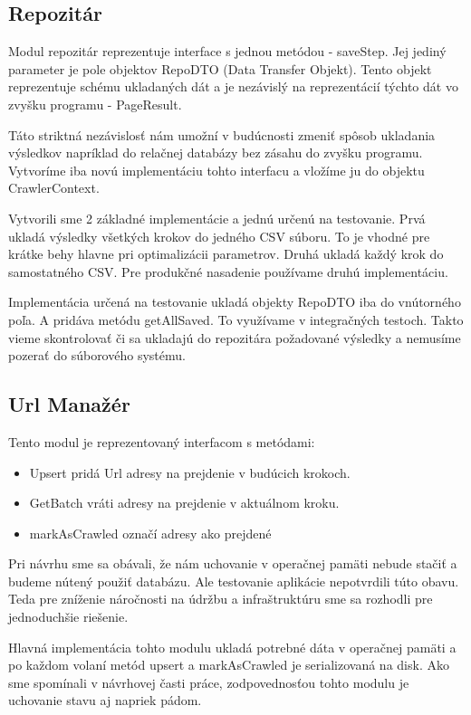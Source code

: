 \subsection{Repozitár}
Modul repozitár reprezentuje interface s jednou metódou - saveStep. Jej jediný parameter je pole objektov RepoDTO (Data Transfer Objekt). Tento objekt reprezentuje schému ukladaných dát a je nezávislý na reprezentácií týchto dát vo zvyšku programu - PageResult. 

Táto striktná nezávislosť nám umožní v budúcnosti zmeniť spôsob ukladania výsledkov napríklad do relačnej databázy bez zásahu do zvyšku programu. Vytvoríme iba novú implementáciu tohto interfacu a vložíme ju do objektu CrawlerContext. 

Vytvorili sme 2 základné implementácie a jednú určenú na testovanie. Prvá ukladá výsledky všetkých krokov do jedného CSV súboru. To je vhodné pre krátke behy hlavne pri optimalizácii parametrov. Druhá ukladá každý krok do samostatného CSV. Pre produkčné nasadenie používame druhú implementáciu. 

Implementácia určená na testovanie ukladá objekty RepoDTO iba do vnútorného poľa. A pridáva metódu getAllSaved. To využívame v integračných testoch. Takto vieme skontrolovať či sa ukladajú do repozitára požadované výsledky a nemusíme pozerať do súborového systému. 


\subsection{Url Manažér}
Tento modul je reprezentovaný interfacom s metódami:
\begin{itemize}
    \item Upsert pridá Url adresy na prejdenie v budúcich krokoch. 
    \item GetBatch vráti adresy na prejdenie v aktuálnom kroku. 
    \item markAsCrawled označí adresy ako prejdené
\end{itemize}


Pri návrhu sme sa obávali, že nám uchovanie v operačnej pamäti nebude stačiť a budeme nútený použiť databázu. Ale testovanie aplikácie nepotvrdili túto obavu. Teda pre zníženie náročnosti na údržbu a infraštruktúru sme sa rozhodli pre jednoduchšie riešenie.

Hlavná implementácia tohto modulu ukladá potrebné dáta v operačnej pamäti a po každom volaní metód upsert a markAsCrawled je serializovaná na disk. Ako sme spomínali v návrhovej časti práce, zodpovednosťou tohto modulu je uchovanie stavu aj napriek pádom. 


